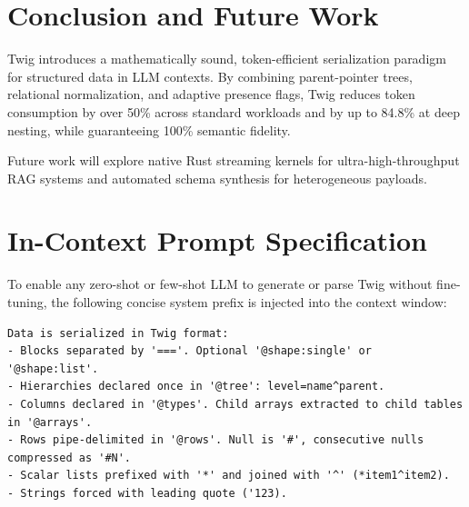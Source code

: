 \documentclass[11pt,a4paper]{article}
\begin{document}
\section{Conclusion and Future Work}
Twig introduces a mathematically sound, token-efficient serialization paradigm for structured data in LLM contexts. By combining parent-pointer trees, relational normalization, and adaptive presence flags, Twig reduces token consumption by over 50\% across standard workloads and by up to 84.8\% at deep nesting, while guaranteeing 100\% semantic fidelity. 

Future work will explore native Rust streaming kernels for ultra-high-throughput RAG systems and automated schema synthesis for heterogeneous payloads.




\appendix
\section{In-Context Prompt Specification}
To enable any zero-shot or few-shot LLM to generate or parse Twig without fine-tuning, the following concise system prefix is injected into the context window:

\begin{lstlisting}[basicstyle=\ttfamily\scriptsize]
Data is serialized in Twig format:
- Blocks separated by '==='. Optional '@shape:single' or '@shape:list'.
- Hierarchies declared once in '@tree': level=name^parent.
- Columns declared in '@types'. Child arrays extracted to child tables in '@arrays'.
- Rows pipe-delimited in '@rows'. Null is '#', consecutive nulls compressed as '#N'.
- Scalar lists prefixed with '*' and joined with '^' (*item1^item2).
- Strings forced with leading quote ('123).
\end{lstlisting}
\end{document}
